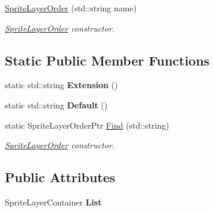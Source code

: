 \begin{DoxyCompactItemize}
\item 
\hypertarget{classDCEngine_1_1SpriteLayerOrder_a58283fbf25f4c461374c6bad2e3c69ae}{\hyperlink{classDCEngine_1_1SpriteLayerOrder_a58283fbf25f4c461374c6bad2e3c69ae}{Sprite\-Layer\-Order} (std\-::string name)}\label{classDCEngine_1_1SpriteLayerOrder_a58283fbf25f4c461374c6bad2e3c69ae}

\begin{DoxyCompactList}\small\item\em \hyperlink{classDCEngine_1_1SpriteLayerOrder}{Sprite\-Layer\-Order} constructor. \end{DoxyCompactList}\end{DoxyCompactItemize}
\subsection*{Static Public Member Functions}
\begin{DoxyCompactItemize}
\item 
\hypertarget{classDCEngine_1_1SpriteLayerOrder_ad2e8d5085f959fdaf5b341c7b6d0afe5}{static std\-::string {\bfseries Extension} ()}\label{classDCEngine_1_1SpriteLayerOrder_ad2e8d5085f959fdaf5b341c7b6d0afe5}

\item 
\hypertarget{classDCEngine_1_1SpriteLayerOrder_a5ccd5d78a0795e96edbacfeddba54708}{static std\-::string {\bfseries Default} ()}\label{classDCEngine_1_1SpriteLayerOrder_a5ccd5d78a0795e96edbacfeddba54708}

\item 
static Sprite\-Layer\-Order\-Ptr \hyperlink{classDCEngine_1_1SpriteLayerOrder_afcc73b8550e14261753824df4cd7fc8e}{Find} (std\-::string)
\begin{DoxyCompactList}\small\item\em \hyperlink{classDCEngine_1_1SpriteLayerOrder}{Sprite\-Layer\-Order} constructor. \end{DoxyCompactList}\end{DoxyCompactItemize}
\subsection*{Public Attributes}
\begin{DoxyCompactItemize}
\item 
\hypertarget{classDCEngine_1_1SpriteLayerOrder_a0d781dd00039f35d07ae93faca5df321}{Sprite\-Layer\-Container {\bfseries List}}\label{classDCEngine_1_1SpriteLayerOrder_a0d781dd00039f35d07ae93faca5df321}

\end{DoxyCompactItemize}
